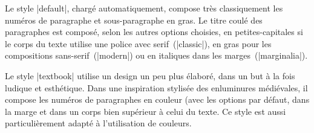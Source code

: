 \begin{macro}
\end{macro}


Le style |default|, chargé automatiquement, compose très classiquement les numéros de paragraphe et sous-paragraphe en gras. Le titre coulé des paragraphes est composé, selon les autres options choisies, en petites-capitales si le corps du texte utilise une police avec serif~(|classic|), en gras pour les compositions sans-serif~(|modern|) ou en italiques dans les marges~(|marginalia|).

\begin{noprint}
\end{noprint}

Le style |textbook| utilise un design un peu plus élaboré, dans un but à la fois ludique et esthétique. Dans une inspiration stylisée des enluminures médiévales, il compose les numéros de paragraphes en couleur (avec les options par défaut, dans la marge et dans un corps bien supérieur à celui du texte. Ce style est aussi particulièrement adapté à l'utilisation de couleurs.

\begin{noprint}
\end{noprint}

